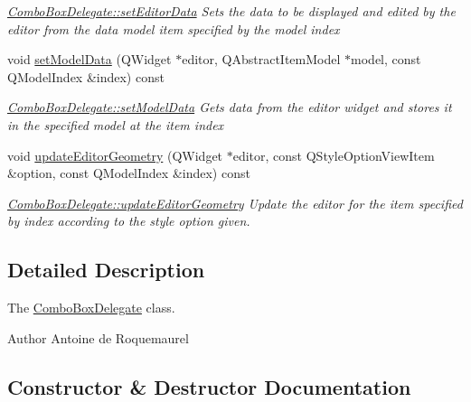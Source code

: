 \begin{DoxyCompactItemize}
\begin{DoxyCompactList}\small\item\em \hyperlink{classGui_1_1Widgets_1_1Delegates_1_1ComboBoxDelegate_a30d218e265b7656e17fece8a73e53e90}{Combo\+Box\+Delegate\+::set\+Editor\+Data} Sets the data to be displayed and edited by the {\itshape editor} from the data model item specified by the model {\itshape index} \end{DoxyCompactList}\item 
void \hyperlink{classGui_1_1Widgets_1_1Delegates_1_1ComboBoxDelegate_a2f2d51e4e44e7f3cdc9baac783bbc1b1}{set\+Model\+Data} (Q\+Widget $\ast$editor, Q\+Abstract\+Item\+Model $\ast$model, const Q\+Model\+Index \&index) const 
\begin{DoxyCompactList}\small\item\em \hyperlink{classGui_1_1Widgets_1_1Delegates_1_1ComboBoxDelegate_a2f2d51e4e44e7f3cdc9baac783bbc1b1}{Combo\+Box\+Delegate\+::set\+Model\+Data} Gets data from the {\itshape editor} widget and stores it in the specified {\itshape model} at the item {\itshape index} \end{DoxyCompactList}\item 
void \hyperlink{classGui_1_1Widgets_1_1Delegates_1_1ComboBoxDelegate_abdf54b72e544b24cc34270154ae6aed3}{update\+Editor\+Geometry} (Q\+Widget $\ast$editor, const Q\+Style\+Option\+View\+Item \&option, const Q\+Model\+Index \&index) const 
\begin{DoxyCompactList}\small\item\em \hyperlink{classGui_1_1Widgets_1_1Delegates_1_1ComboBoxDelegate_abdf54b72e544b24cc34270154ae6aed3}{Combo\+Box\+Delegate\+::update\+Editor\+Geometry} Update the {\itshape editor} for the item specified by {\itshape index} according to the style {\itshape option} given. \end{DoxyCompactList}\end{DoxyCompactItemize}


\subsection{Detailed Description}
The \hyperlink{classGui_1_1Widgets_1_1Delegates_1_1ComboBoxDelegate}{Combo\+Box\+Delegate} class. 

\begin{DoxyAuthor}{Author}
Antoine de Roquemaurel 
\end{DoxyAuthor}


\subsection{Constructor \& Destructor Documentation}
\hypertarget{classGui_1_1Widgets_1_1Delegates_1_1ComboBoxDelegate_a34105ef48d776c556598b9b15e7abdcc}{}
